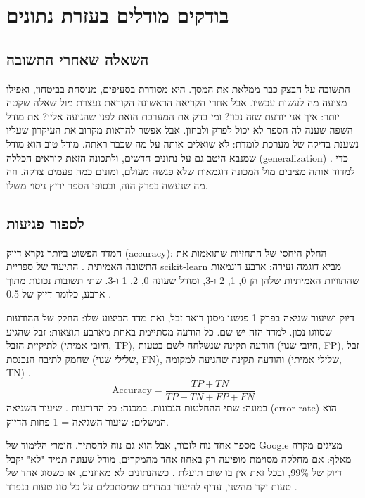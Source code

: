 \chapter{בודקים מודלים בעזרת נתונים}\label{ch:05}
\section{השאלה שאחרי התשובה}
התשובה על הבצק כבר ממלאת את המסך. היא מסודרת בסעיפים, מנוסחת בביטחון, ואפילו מציעה מה לעשות עכשיו. אבל אחרי הקריאה הראשונה הקוראת נעצרת מול שאלה שקטה יותר: איך אני יודעת שזה נכון? ומי בדק את המערכת הזאת לפני שהגיעה אליי?
את מודל השפה שענה לה הספר לא יכול לפרק ולבחון. אבל אפשר להראות מקרוב את העיקרון שעליו נשענת בדיקה של מערכת לומדת: לא שואלים אותה על מה שכבר ראתה. מודל טוב הוא מודל שמנבא היטב גם על נתונים חדשים, ולתכונה הזאת קוראים הכללה (generalization) \cite{S-ch05-08}. כדי למדוד אותה מציבים מול המכונה דוגמאות שלא פגשה מעולם, ומונים כמה פעמים צדקה.
וזה מה שנעשה בפרק הזה, ובסופו הספר יריץ ניסוי משלו.
\section{לספור פגיעות}
המדד הפשוט ביותר נקרא דיוק (accuracy): החלק היחסי של התחזיות שתואמות את התשובה האמיתית \cite{S-ch05-01}. התיעוד של ספריית scikit-learn מביא דוגמה זעירה: ארבע דוגמאות שהתוויות האמיתיות שלהן הן 0, 1, 2 ו-3, ומודל שעונה 0, 2, 1 ו-3. שתי תשובות נכונות מתוך ארבע, כלומר דיוק של 0.5 \cite{S-ch05-01}.
\begin{conceptbox}{דיוק ושיעור שגיאה}
בפרק 1 פגשנו מסנן דואר זבל, ואת מדד הביצוע שלו: החלק של ההודעות שסווגו נכון. למדד הזה יש שם. כל הודעה מסתיימת באחת מארבע תוצאות: זבל שהגיע לתיקיית הזבל (חיובי אמיתי, TP), הודעה תקינה שנשלחה לשם בטעות (חיובי שגוי, FP), זבל שחמק לתיבה הנכנסת (שלילי שגוי, FN), והודעה תקינה שהגיעה למקומה (שלילי אמיתי, TN) \cite{S-ch05-07}.
\begin{equation}
\text{Accuracy} = \frac{TP + TN}{TP + TN + FP + FN}
\end{equation}
במונה: שתי ההחלטות הנכונות. במכנה: כל ההודעות \cite{S-ch05-06}.
שיעור השגיאה (error rate) הוא המשלים: שיעור השגיאה = 1 פחות הדיוק.
\end{conceptbox}
מספר אחד נוח לזכור, אבל הוא גם נוח להסתיר. חומרי הלימוד של Google מציגים מקרה מאלף: אם מחלקה מסוימת מופיעה רק באחוז אחד מהמקרים, מודל שעונה תמיד "לא" יקבל דיוק של 99\%, ובכל זאת אין בו שום תועלת \cite{S-ch05-06}. כשהנתונים לא מאוזנים, או כשסוג אחד של טעות יקר מהשני, עדיף להיעזר במדדים שמסתכלים על כל סוג טעות בנפרד \cite{S-ch05-06}.
